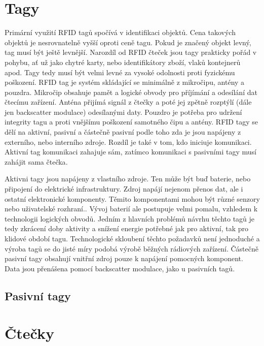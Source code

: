 \section{Tagy}
Primární využití RFID tagů spočívá v identifikaci objektů. Cena takových objektů je nesrovnatelně vyšší oproti ceně tagu. Pokud je značený objekt levný, tag musí být ještě levnější. Narozdíl od RFID čteček jsou tagy prakticky pořád v pohybu, ať už jako chytré karty, nebo identifikátory zboží, vlaků kontejnerů apod. Tagy tedy musí být velmi levné za vysoké odolnosti proti fyzickému poškození\cite{The_RF_in_RFID}.
RFID tag je systém skládající se minimálně z mikročipu, antény a pouzdra. Mikročip obsahuje pamět a logické obvody pro příjímání a odesílání dat čtecímu zařízení. Anténa přijímá signál z čtečky a poté jej zpětně rozptýlí (dále jen backscatter modulace) odesílanými daty. Pouzdro je potřeba pro udržení integrity tagu a proti vnějšímu poškození samotného čipu a antény\cite{RFID_explained}.
RFID tagy se dělí na aktivní, pasivní a částečně pasivní podle toho zda je jsou napájeny z externího, nebo interního zdroje\cite{The_RF_in_RFID}. Rozdíl je také v tom, kdo iniciuje komunikaci. Aktivní tag komunikaci zahajuje sám, zatímco komunikaci s pasivními tagy musí zahájit sama čtečka\cite{Hazardous_areas}. 
\par
Aktivni tagy jsou napájeny z vlastního zdroje. Ten může být buď baterie, nebo připojení do elektrické infrastruktury. Zdroj napájí nejenom přenos dat, ale i ostatní elektronické komponenty. Těmito komponentami mohou být různé senzory nebo uživatelské rozhraní.\cite{RFID_explained}. Vývoj baterií ale postupuje velmi pomalu, vzhledem k technologii logických obvodů. Jedním z hlavních problémů návrhu těchto tagů je tedy zkrácení doby aktivity a snížení energie potřebné jak pro aktivní, tak pro klidové období tagu. Technologické skloubení těchto požadavků není jednoduché a výroba tagů se do jisté míry podobá výrobě běžných rádiových zařízení\cite{The_RF_in_RFID}. 
Částečně pasivní tagy obsahují vnitřní zdroj pouze k napájení pomocných komponent. Data jsou přenášena pomocí backscatter modulace, jako u pasivních tagů\cite{Survey_of_RFID_Tags}.

\subsection{Pasivní tagy}


\section{Čtečky}

